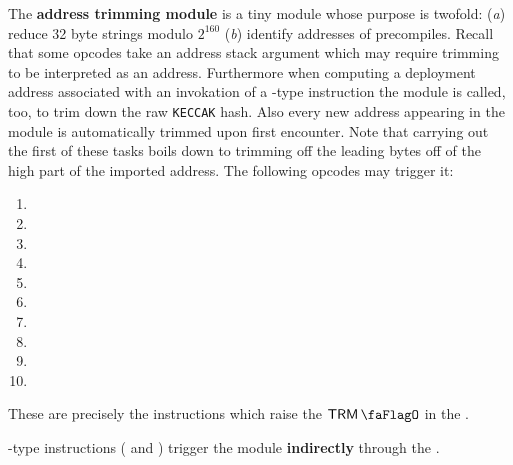 The \textbf{address trimming module} is a tiny module whose purpose is twofold:
(\emph{a})
reduce 32 byte strings modulo $2^{160}$
(\emph{b})
identify addresses of precompiles.
Recall that some opcodes take an address stack argument which may require trimming to be interpreted as an address.
Furthermore when computing a deployment address associated with an invokation of a -type instruction the \rlpAddrMod{} module is called, too, to trim down the raw \texttt{KECCAK} hash.
Also every new address appearing in the \hubMod{} module is automatically trimmed upon first encounter.
Note that carrying out the first of these tasks boils down to trimming off the leading bytes off of the high part of the imported address. The following opcodes may trigger it:
\begin{multicols}{4}
\begin{enumerate}
	\item {}
	\item {}
	\item {}
	\item {}
	\item {}
	\item {}
	\item {}
	\item {}
	\item {}
	\item[\vspace{\fill}]
\end{enumerate}
\end{multicols}
These are precisely the instructions which raise the $\trmFlag$ in the \hubMod{}.

\saNote{} -type instructions ( and ) trigger the \trmMod{} module \textbf{indirectly} through the \rlpAddrMod{}.
